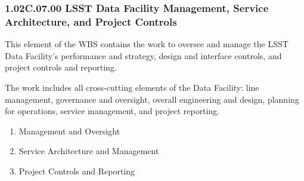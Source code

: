 \subsubsection{1.02C.07.00 LSST Data Facility Management, Service Architecture, and Project Controls}

This element of the WBS contains the work to oversee and manage the LSST Data Facility's performance and strategy, design and interface controls, and project controls and reporting.

The work includes all cross-cutting elements of the Data Facility: line management, governance and oversight, overall engineering and design, planning for operations, service management, and project reporting.

\begin{enumerate}

  \item{Management and Oversight}
  \item{Service Architecture and Management}
  \item{Project Controls and Reporting}

\end{enumerate}

